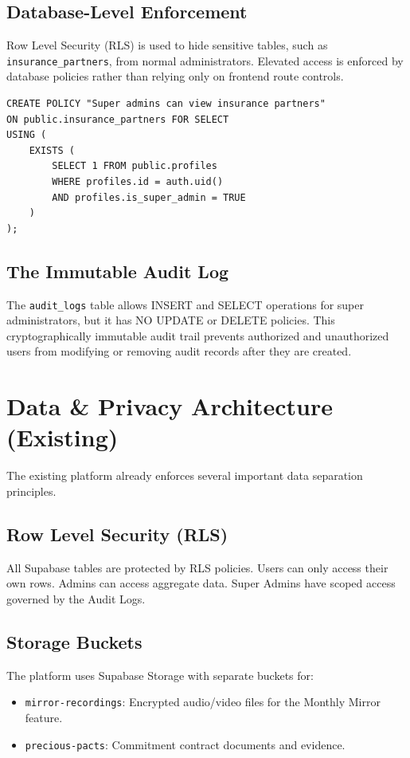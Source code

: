 \documentclass[11pt,a4paper]{article}
\begin{document}
\subsection{Database-Level Enforcement}
Row Level Security (RLS) is used to hide sensitive tables, such as \texttt{insurance\_partners}, from normal administrators. Elevated access is enforced by database policies rather than relying only on frontend route controls.

\lstset{language=SQL}
\begin{lstlisting}
CREATE POLICY "Super admins can view insurance partners"
ON public.insurance_partners FOR SELECT
USING (
    EXISTS (
        SELECT 1 FROM public.profiles
        WHERE profiles.id = auth.uid()
        AND profiles.is_super_admin = TRUE
    )
);
\end{lstlisting}

\subsection{The Immutable Audit Log}
The \texttt{audit\_logs} table allows INSERT and SELECT operations for super administrators, but it has NO UPDATE or DELETE policies. This cryptographically immutable audit trail prevents authorized and unauthorized users from modifying or removing audit records after they are created.

\section{Data \& Privacy Architecture (Existing)}
The existing platform already enforces several important data separation principles.

\subsection{Row Level Security (RLS)}
All Supabase tables are protected by RLS policies. Users can only access their own rows. Admins can access aggregate data. Super Admins have scoped access governed by the Audit Logs.

\subsection{Storage Buckets}
The platform uses Supabase Storage with separate buckets for:
\begin{itemize}
    \item \texttt{mirror-recordings}: Encrypted audio/video files for the Monthly Mirror feature.
    \item \texttt{precious-pacts}: Commitment contract documents and evidence.
\end{itemize}
\end{document}
